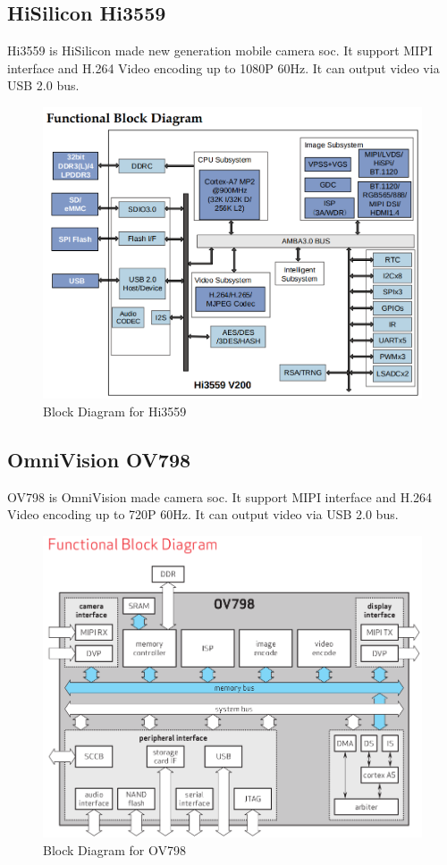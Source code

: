 \documentclass[12pt,article]{memoir}
\begin{document}
\subsection{HiSilicon Hi3559}
Hi3559 is HiSilicon made new generation mobile camera soc. It support MIPI interface and H.264 Video encoding up to 1080P 60Hz. It can output video via USB 2.0 bus.\cite{huawei:Hi3559}
\begin{figure}[htp]
\begin{center}
\includegraphics[width=\textwidth]{img/DR00002_Hi3559.png}
 \caption{Block Diagram for Hi3559}	
\end{center}
\end{figure}
\newpage
\subsection{OmniVision OV798}
OV798 is OmniVision made camera soc. It support MIPI interface and H.264 Video encoding up to 720P 60Hz. It can output video via USB 2.0 bus.\cite{omni:OV798}
\begin{figure}[htp]
\begin{center}
\includegraphics[width=\textwidth]{img/DR00002_Omni.png}
 \caption{Block Diagram for OV798}	
\end{center}
\end{figure}
\newpage
\end{document}
